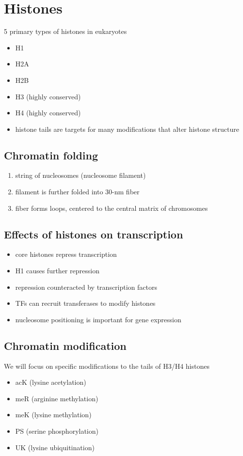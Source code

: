 \documentclass[10pt]{article}
\newenvironment{mitemize}
{
  \begin{itemize}
  \setlength{\itemsep}{1pt}
  \setlength{\parskip}{0pt}
  \setlength{\parsep}{0pt}}{\end{itemize}
}
\newenvironment{menumerate}
{
  \begin{enumerate}
  \setlength{\itemsep}{1pt}
  \setlength{\parskip}{0pt}
  \setlength{\parsep}{0pt}}{\end{enumerate}
}
\begin{document}
\section*{Histones}
5 primary types of histones in eukaryotes
\begin{mitemize}
  \item H1
  \item H2A
  \item H2B
  \item H3 (highly conserved)
  \item H4 (highly conserved)
  \item histone tails are targets for many modifications that alter histone structure
\end{mitemize}

\subsection*{Chromatin folding}
\begin{menumerate}
  \item string of nucleosomes (nucleosome filament)
  \item filament is further folded into 30-nm fiber
  \item fiber forms loops, centered to the central matrix of chromosomes
\end{menumerate}

\subsection*{Effects of histones on transcription}
\begin{mitemize}
  \item core histones repress transcription
  \item H1 causes further repression
  \item repression counteracted by transcription factors
  \item TFs can recruit transferases to modify histones
  \item nucleosome positioning is important for gene expression
\end{mitemize}

\subsection*{Chromatin modification}
We will focus on specific modifications to the tails of H3/H4 histones
\begin{mitemize}
  \item acK (lysine acetylation)
  \item meR (arginine methylation)
  \item meK (lysine methylation)
  \item PS (serine phosphorylation)
  \item UK (lysine ubiquitination)
\end{mitemize}
\end{document}
